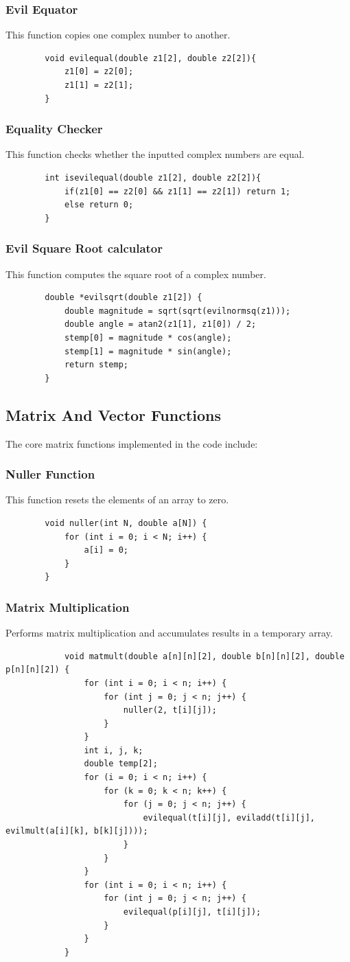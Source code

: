 \documentclass[12pt]{article}
\begin{document}
	\subsubsection{Evil Equator}
	This function copies one complex number to another.
	\begin{lstlisting}
		void evilequal(double z1[2], double z2[2]){
			z1[0] = z2[0];
			z1[1] = z2[1];
		}
	\end{lstlisting}
	\subsubsection{Equality Checker}
	This function checks whether the inputted complex numbers are equal.
	\begin{lstlisting}
		int isevilequal(double z1[2], double z2[2]){
			if(z1[0] == z2[0] && z1[1] == z2[1]) return 1;
			else return 0;
		}
	\end{lstlisting}
	\subsubsection{Evil Square Root calculator}
	This function computes the square root of a complex number.
	\begin{lstlisting}
		double *evilsqrt(double z1[2]) {
			double magnitude = sqrt(sqrt(evilnormsq(z1)));
			double angle = atan2(z1[1], z1[0]) / 2; 
			stemp[0] = magnitude * cos(angle);
			stemp[1] = magnitude * sin(angle);
			return stemp;
		}
	\end{lstlisting}
	\subsection{Matrix And Vector Functions}
	The core matrix functions implemented in the code include:
	
	\subsubsection{Nuller Function}
	This function resets the elements of an array to zero.
	\begin{lstlisting}
		void nuller(int N, double a[N]) {
			for (int i = 0; i < N; i++) {
				a[i] = 0;
			}
		}
	\end{lstlisting}
	
	\subsubsection{Matrix Multiplication}
	Performs matrix multiplication and accumulates results in a temporary array.
		\begin{lstlisting}
			void matmult(double a[n][n][2], double b[n][n][2], double p[n][n][2]) {
				for (int i = 0; i < n; i++) {
					for (int j = 0; j < n; j++) {
						nuller(2, t[i][j]);
					}
				}
				int i, j, k;
				double temp[2];
				for (i = 0; i < n; i++) {
					for (k = 0; k < n; k++) {
						for (j = 0; j < n; j++) {
							evilequal(t[i][j], eviladd(t[i][j], evilmult(a[i][k], b[k][j])));
						}
					}
				}
				for (int i = 0; i < n; i++) {
					for (int j = 0; j < n; j++) {
						evilequal(p[i][j], t[i][j]);
					}
				}
			}
		\end{lstlisting}
	
\end{document}
